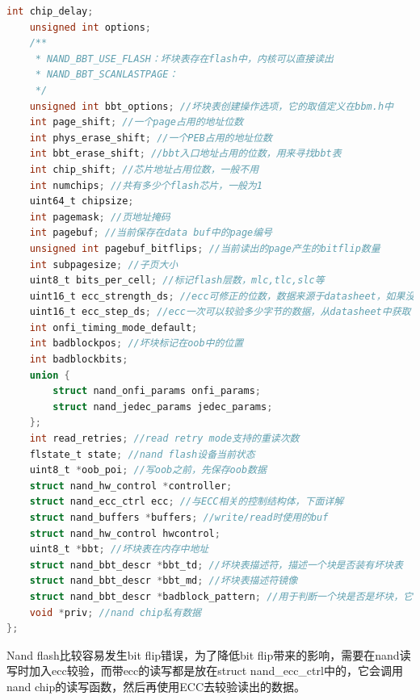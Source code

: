 \begin{lstlisting}[language=C]
	int chip_delay;
	unsigned int options;
	/**
	 * NAND_BBT_USE_FLASH：坏块表存在flash中，内核可以直接读出
	 * NAND_BBT_SCANLASTPAGE：
	 */
	unsigned int bbt_options; //坏块表创建操作选项，它的取值定义在bbm.h中
	int page_shift; //一个page占用的地址位数
	int phys_erase_shift; //一个PEB占用的地址位数
	int bbt_erase_shift; //bbt入口地址占用的位数，用来寻找bbt表
	int chip_shift; //芯片地址占用位数，一般不用
	int numchips; //共有多少个flash芯片，一般为1
	uint64_t chipsize;
	int pagemask; //页地址掩码
	int pagebuf; //当前保存在data buf中的page编号
	unsigned int pagebuf_bitflips; //当前读出的page产生的bitflip数量
	int subpagesize; //子页大小
	uint8_t bits_per_cell; //标记flash层数，mlc,tlc,slc等
	uint16_t ecc_strength_ds; //ecc可修正的位数，数据来源于datasheet，如果没有设为0
	uint16_t ecc_step_ds; //ecc一次可以较验多少字节的数据，从datasheet中获取
	int onfi_timing_mode_default;
	int badblockpos; //坏块标记在oob中的位置
	int badblockbits;
	union {
		struct nand_onfi_params	onfi_params;
		struct nand_jedec_params jedec_params;
	};
	int read_retries; //read retry mode支持的重读次数
	flstate_t state; //nand flash设备当前状态
	uint8_t *oob_poi; //写oob之前，先保存oob数据
	struct nand_hw_control *controller;
	struct nand_ecc_ctrl ecc; //与ECC相关的控制结构体，下面详解
	struct nand_buffers *buffers; //write/read时使用的buf
	struct nand_hw_control hwcontrol;
	uint8_t *bbt; //坏块表在内存中地址
	struct nand_bbt_descr *bbt_td; //坏块表描述符，描述一个块是否装有坏块表
	struct nand_bbt_descr *bbt_md; //坏块表描述符镜像
	struct nand_bbt_descr *badblock_pattern; //用于判断一个块是否是坏块，它的pattern是0xff
	void *priv; //nand chip私有数据
};

\end{lstlisting}
Nand flash比较容易发生bit flip错误，为了降低bit flip带来的影响，需要在nand读写时加入ecc较验，而带ecc的读写都是放在struct nand\_ecc\_ctrl中的，它会调用nand chip的读写函数，然后再使用ECC去较验读出的数据。
